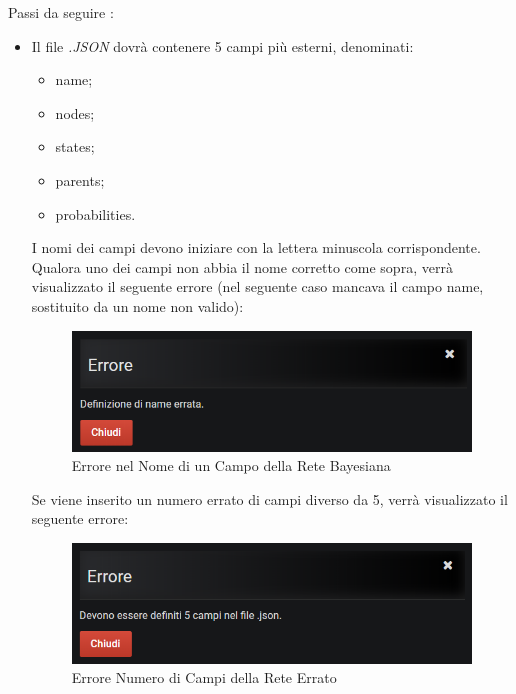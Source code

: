 Passi da seguire :
\begin{itemize}
 \item Il file \textit{.JSON} dovrà contenere 5 campi più esterni, denominati:
 	\begin{itemize}
 		\item name;
 		\item nodes;
 		\item states;
 		\item parents;
 		\item probabilities.
 	\end{itemize}
 	I nomi dei campi devono iniziare con la lettera minuscola corrispondente. Qualora uno dei campi non abbia il nome corretto come sopra, verrà visualizzato il seguente errore (nel seguente caso mancava il campo name, sostituito da un nome non valido):
 	 
 	\begin{figure}[H]
	\begin{center}
		\includegraphics[scale=0.8]{./images/erroreNomeCampo.png}
		 \caption{Errore nel Nome di un Campo della Rete Bayesiana}	
		 \label{ImgRete}
	\end{center}
\end{figure}

	Se viene inserito un numero errato di campi diverso da 5, verrà visualizzato il seguente errore:
	
	\begin{figure}[H]
	\begin{center}
		\includegraphics[scale=0.8]{./images/wrongNumberOfFields.png}
		 \caption{Errore Numero di Campi della Rete Errato}	
		 \label{ImgRete}
	\end{center}
\end{figure}


\end{itemize}
